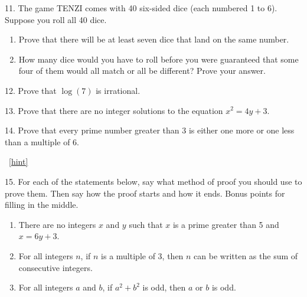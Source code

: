 \documentclass[10pt,]{book}
\theoremstyle{plain}
\theoremstyle{definition}
\theoremstyle{definition}
\theoremstyle{definition}
\numberwithin{equation}{chapter}
\begin{document}
\begin{exerciselist}
\par\smallskip
\item[11.]\hypertarget{exercise-125}{}\hypertarget{p-2625}{}%
The game TENZI comes with 40 six-sided dice (each numbered 1 to 6). Suppose you roll all 40 dice. \leavevmode%
\begin{enumerate}[label=(\alph*)]
\item\hypertarget{li-543}{}Prove that there will be at least seven dice that land on the same number.%
\item\hypertarget{li-544}{}\hypertarget{p-2626}{}%
How many dice would you have to roll before you were guaranteed that some four of them would all match or all be different? Prove your answer.%
\end{enumerate}
%
\par\smallskip
\item[12.]\hypertarget{exercise-126}{}\hypertarget{p-2632}{}%
Prove that \(\log(7)\) is irrational.%
\par\smallskip
\item[13.]\hypertarget{exercise-127}{}\hypertarget{p-2637}{}%
Prove that there are no integer solutions to the equation \(x^2 = 4y + 3\).%
\par\smallskip
\item[14.]\hypertarget{exercise-128}{}\hypertarget{p-2638}{}%
Prove that every prime number greater than 3 is either one more or one less than a multiple of 6.%
\par\smallskip
~\hfill{\tiny\hyperlink{a-B.5.14}{[hint]}\hypertarget{q-B.5.14}{}}\item[15.]\hypertarget{exercise-129}{}\hypertarget{p-2640}{}%
For each of the statements below, say what method of proof you should use to prove them. Then say how the proof starts and how it ends. Bonus points for filling in the middle.%
\par
\hypertarget{p-2641}{}%
\leavevmode%
\begin{enumerate}[label=(\alph*)]
\item\hypertarget{li-547}{}\hypertarget{p-2642}{}%
There are no integers \(x\) and \(y\) such that \(x\) is a prime greater than 5 and \(x = 6y + 3\).%
\item\hypertarget{li-548}{}\hypertarget{p-2643}{}%
For all integers \(n\), if \(n\) is a multiple of 3, then \(n\) can be written as the sum of consecutive integers.%
\item\hypertarget{li-549}{}\hypertarget{p-2644}{}%
For all integers \(a\) and \(b\), if \(a^2 + b^2\) is odd, then \(a\) or \(b\) is odd.%
\end{enumerate}

\end{exerciselist}
\end{document}
